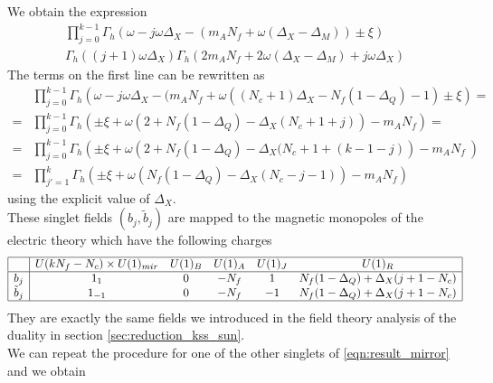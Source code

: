 We obtain the expression
\begin{multline}
\prod_{j=0}^{k-1} \Gamma_h \left( \omega - j \omega \Delta_X - ( m_A N_f + \omega(\Delta_X - \Delta_M)) \pm {\xi} \right) 
\\
\Gamma_h \left(  (j+1) \omega \Delta_X   \right)
\Gamma_h \left( 2 m_A N_f + 2 \omega(\Delta_X - \Delta_M) + j \omega \Delta_X \right)
\label{eqn:result_mirror}
\end{multline}
The terms on the first line can be rewritten as
\begin{equation}
\begin{aligned}
& \prod_{j=0}^{k-1} \Gamma_h \left( \omega - j \omega \Delta_X - ( m_A N_f + \omega( (N_c+1) \Delta_X - N_f (1 - \Delta_Q ) - 1) \pm \xi \right) = \\
= & \prod_{j=0}^{k-1} \Gamma_h \left( \pm \xi +\omega \left(
 2 + N_f ( 1 - \Delta_Q ) - \Delta_X ( N_c +1 + j)  \right) - m_A N_f
 \right) = \\
 = & \prod_{j=0}^{k-1} \Gamma_h \left( \pm \xi +\omega \left(
 2 + N_f ( 1 - \Delta_Q ) - \Delta_X ( N_c +1 + ( k - 1 - j )  \right) - m_A N_f \
 \right) \\
=   & \prod_{j'=1}^{k} \Gamma_h \left( \pm \xi +\omega \left(
	N_f ( 1 - \Delta_Q ) - \Delta_X ( N_c - j - 1)  \right) - m_A N_f
 \right)
\end{aligned}
\end{equation}
using the explicit value of $\Delta_X$.\\
These singlet fields $(b_j,\tilde{b}_j) $ are mapped to the magnetic monopoles of the electric theory which have the following charges
\begin{equation}
\begin{array}
{| c | c  c  c c  c | }
		\hline
			&  U ( k N_f - N_c) \times U(1)_{mir} & U(1)_B & U(1)_A   & U(1)_J & U(1)_R \\
			\hline
		b_j   &  1_{1}              & 0   & -  N_f& 1 &  N_f ( 1 - \Delta_Q) + \Delta_X (j +1 - N_c)  \\
		\tilde{b}_j   &  1_{-1}             & 0   & - N_f& -1  &  N_f ( 1 - \Delta_Q) + \Delta_X (j +1  - N_c) \\
		\hline
\end{array}
\end{equation}
They are exactly the same fields we introduced in the field theory analysis of the duality in section \ref{sec:reduction_kss_sun}.\\
We can repeat the procedure for one of the other singlets of \eqref{eqn:result_mirror} and we obtain
